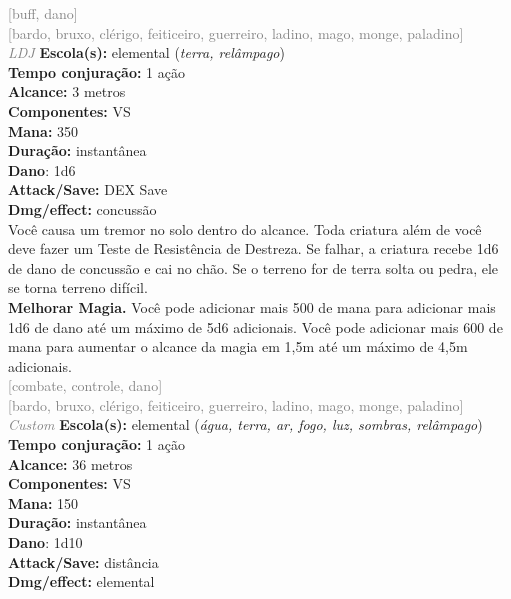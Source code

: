 \documentclass{RPG_Adventure}[2021/10/20]
\begin{document}
{\scriptsize \textcolor{gray}{[buff, dano]\\}}
{\scriptsize \textcolor{gray}{[bardo, bruxo, clérigo, feiticeiro, guerreiro, ladino, mago, monge, paladino]\\}}
{\tiny \textcolor{gray}{\textit{LDJ}}}
{\small \t \textbf{Escola(s):} elemental (\textit{terra, relâmpago})\\\t \textbf{Tempo conjuração:} 1 ação\\\t \textbf{Alcance:} 3 metros\\\t \textbf{Componentes:} VS\\\t \textbf{Mana:} 350\\\t \textbf{Duração:} instantânea\\\t \textbf{Dano}: 1d6\\\t \textbf{Attack/Save:} DEX Save\\\t \textbf{Dmg/effect:} concussão\\}
{\normalsize Você causa um tremor no solo dentro do alcance. Toda criatura além de você deve fazer um Teste de Resistência de Destreza. Se falhar, a criatura recebe 1d6 de dano de concussão e cai no chão. Se o terreno for de terra solta ou pedra, ele se torna terreno difícil.\\\t \textbf{Melhorar Magia.} Você pode adicionar mais 500 de mana para adicionar mais 1d6 de dano até um máximo de 5d6 adicionais. Você pode adicionar mais 600 de mana para aumentar o alcance da magia em 1,5m até um máximo de 4,5m adicionais.\\}
{\scriptsize \textcolor{gray}{[combate, controle, dano]\\}}
{\scriptsize \textcolor{gray}{[bardo, bruxo, clérigo, feiticeiro, guerreiro, ladino, mago, monge, paladino]\\}}
{\tiny \textcolor{gray}{\textit{Custom}}}
{\small \t \textbf{Escola(s):} elemental (\textit{água, terra, ar, fogo, luz, sombras, relâmpago})\\\t \textbf{Tempo conjuração:} 1 ação\\\t \textbf{Alcance:} 36 metros\\\t \textbf{Componentes:} VS\\\t \textbf{Mana:} 150\\\t \textbf{Duração:} instantânea\\\t \textbf{Dano}: 1d10\\\t \textbf{Attack/Save:} distância\\\t \textbf{Dmg/effect:} elemental\\}
\end{document}
